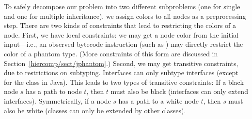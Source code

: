To safely decompose our problem into two different subproblems (one
for single and one for multiple inheritance), we assign colors to all
nodes as a preprocessing step. There are two kinds of constraints that
lead to restricting the colors of a node. First, we have local
constraints: we may get a node color from the initial input---i.e., an
observed bytecode instruction (such as ) may
directly restrict the color of a phantom type. (More constraints of
this form are discussed in Section~\ref{hiercomp/sect/jphantom}.) Second, we may get
transitive constraints, due to restrictions on subtyping. Interfaces
can only subtype interfaces (except for the  class in
Java). This leads to two types of transitive constraints: If a black
node $s$ has a path to node $t$, then $t$ must also be black
(interfaces can only extend interfaces). Symmetrically, if a node $s$
has a path to a white node $t$, then $s$ must also be white (classes
can only be extended by other classes).




